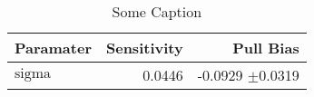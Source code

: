 
\let\oldpm\pm
\renewcommand{\pm}{\ensuremath{\oldpm}}
\begin{table}[h]
\begin{center}
\begin{tabular}{@{}|l|r|r|@{}}
\hline
Paramater & Sensitivity & Pull Bias \\
\hline
$\text{sigma}$ & 0.0446 & -0.0929 \pm 0.0319\\
\hline
\end{tabular}
\caption{Some Caption}
\label{thisTable}
\end{center}
\end{table}
\renewcommand{\pm}{\oldpm}

